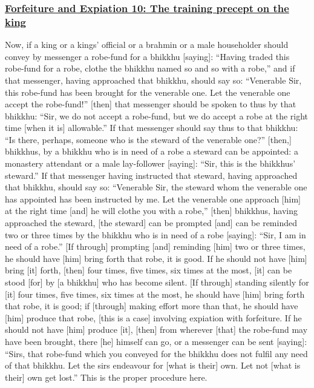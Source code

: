 \subsubsection*{\hyperref[np10]{Forfeiture and Expiation 10: The training precept on the king}}
\label{forf-exp10}
Now, if a king or a kings' official or a brahmin or a male householder should convey by messenger a robe-fund for a bhikkhu [saying]: ``Having traded this robe-fund for a robe, clothe the bhikkhu named so and so with a robe,'' and if that messenger, having approached that bhikkhu, should say so: ``Venerable Sir, this robe-fund has been brought for the venerable one. Let the venerable one accept the robe-fund!'' [then] that messenger should be spoken to thus by that bhikkhu: ``Sir, we do not accept a robe-fund, but we do accept a robe at the right time [when it is] allowable.'' If that messenger should say thus to that bhikkhu: ``Is there, perhaps, someone who is the steward of the venerable one?'' [then,] bhikkhus, by a bhikkhu who is in need of a robe a steward can be appointed: a monastery attendant or a male lay-follower [saying]: ``Sir, this is the bhikkhus' steward.'' If that messenger having instructed that steward, having approached that bhikkhu, should say so: ``Venerable Sir, the steward whom the venerable one has appointed has been instructed by me. Let the venerable one approach [him] at the right time [and] he will clothe you with a robe,'' [then] bhikkhus, having approached the steward, [the steward] can be prompted [and] can be reminded two or three times by the bhikkhu who is in need of a robe [saying]: ``Sir, I am in need of a robe.'' [If through] prompting [and] reminding [him] two or three times, he should have [him] bring forth that robe, it is good. If he should not have [him] bring [it] forth, [then] four times, five times, six times at the most, [it] can be stood [for] by [a bhikkhu] who has become silent. [If through] standing silently for [it] four times, five times, six times at the most, he should have [him] bring forth that robe, it is good; if [through] making effort more than that, he should have [him] produce that robe, [this is a case] involving expiation with forfeiture. If he should not have [him] produce [it], [then] from wherever [that] the robe-fund may have been brought, there [he] himself can go, or a messenger can be sent [saying]: ``Sirs, that robe-fund which you conveyed for the bhikkhu does not fulfil any need of that bhikkhu. Let the sirs endeavour for [what is their] own. Let not [what is their] own get lost.'' This is the proper procedure here.


